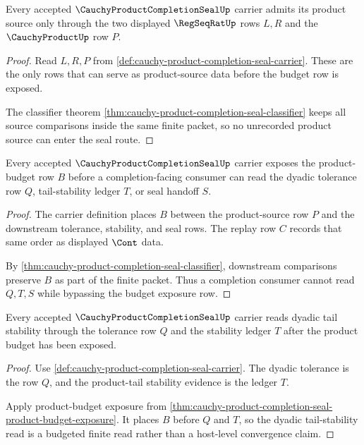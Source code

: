 \begin{theorem}
\label{thm:cauchy-product-completion-seal-source-admission}
Every accepted $\CauchyProductCompletionSealUp$ carrier admits its product source only through the two displayed $\RegSeqRatUp$ rows $L,R$ and the $\CauchyProductUp$ row $P$.
\end{theorem}
\begin{proof}
Read $L,R,P$ from \autoref{def:cauchy-product-completion-seal-carrier}. These are the only rows that can serve as product-source data before the budget row is exposed.

The classifier theorem \autoref{thm:cauchy-product-completion-seal-classifier} keeps all source comparisons inside the same finite packet, so no unrecorded product source can enter the seal route.
\end{proof}

\begin{theorem}
\label{thm:cauchy-product-completion-seal-product-budget-exposure}
Every accepted $\CauchyProductCompletionSealUp$ carrier exposes the product-budget row $B$ before a completion-facing consumer can read the dyadic tolerance row $Q$, tail-stability ledger $T$, or seal handoff $S$.
\end{theorem}
\begin{proof}
The carrier definition places $B$ between the product-source row $P$ and the downstream tolerance, stability, and seal rows. The replay row $C$ records that same order as displayed $\Cont$ data.

By \autoref{thm:cauchy-product-completion-seal-classifier}, downstream comparisons preserve $B$ as part of the finite packet. Thus a completion consumer cannot read $Q,T,S$ while bypassing the budget exposure row.
\end{proof}

\begin{theorem}
\label{thm:cauchy-product-completion-seal-dyadic-tail-stability}
Every accepted $\CauchyProductCompletionSealUp$ carrier reads dyadic tail stability through the tolerance row $Q$ and the stability ledger $T$ after the product budget has been exposed.
\end{theorem}
\begin{proof}
Use \autoref{def:cauchy-product-completion-seal-carrier}. The dyadic tolerance is the row $Q$, and the product-tail stability evidence is the ledger $T$.

Apply product-budget exposure from \autoref{thm:cauchy-product-completion-seal-product-budget-exposure}. It places $B$ before $Q$ and $T$, so the dyadic tail-stability read is a budgeted finite read rather than a host-level convergence claim.
\end{proof}

